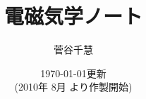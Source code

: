 ﻿%
    \title{
        \Huge{電磁気学ノート}
    }

    \author{
        菅谷\;\;\;千慧
    }

    \date{
        \today \quad 更新\\
        {\small (2010年 8月 より作製開始)}
    }
    \par
